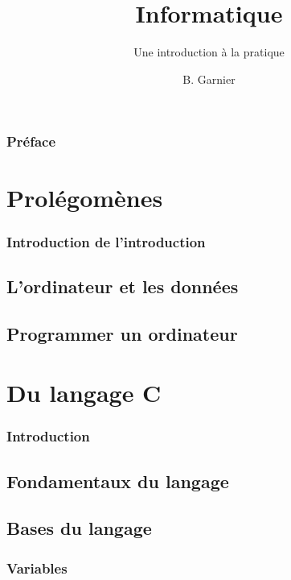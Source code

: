 \documentclass{minitelreport}
\begin{document}
\title{Informatique}
\subtitle{Une introduction à la pratique}
\author{B. Garnier}
\maketitle
\begin{refsection}
\section*{Préface}

\tableofcontents
\listoftables
\listofdefinition
\newpage
\part{Prolégomènes}
	\section*{Introduction de l'introduction}
	
	\chapter{L'ordinateur et les données}
		
	\chapter{Programmer un ordinateur}
		
\part{Du langage C}
	\section*{Introduction}
	
	\chapter{Fondamentaux du langage}
		
	\chapter{Bases du langage}
		\section{Variables}
		

\end{refsection}
\end{document}
